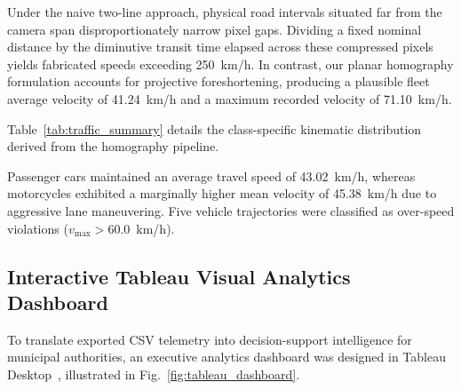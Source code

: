 \documentclass[conference]{IEEEtran}
\begin{document}
Under the naive two-line approach, physical road intervals situated far from the camera span disproportionately narrow pixel gaps. Dividing a fixed nominal distance by the diminutive transit time elapsed across these compressed pixels yields fabricated speeds exceeding 250~km/h. In contrast, our planar homography formulation accounts for projective foreshortening, producing a plausible fleet average velocity of 41.24~km/h and a maximum recorded velocity of 71.10~km/h.

Table~\ref{tab:traffic_summary} details the class-specific kinematic distribution derived from the homography pipeline.

\begin{table}[htbp]
\caption{Class-Wise Vehicle Count and Kinematic Summary}
\label{tab:traffic_summary}
\centering
{}
\end{table}

Passenger cars maintained an average travel speed of 43.02~km/h, whereas motorcycles exhibited a marginally higher mean velocity of 45.38~km/h due to aggressive lane maneuvering. Five vehicle trajectories were classified as over-speed violations ($v_{\text{max}} > 60.0$~km/h).

\subsection{Interactive Tableau Visual Analytics Dashboard}
To translate exported CSV telemetry into decision-support intelligence for municipal authorities, an executive analytics dashboard was designed in Tableau Desktop~\cite{stolte2002polaris}, illustrated in Fig.~\ref{fig:tableau_dashboard}.
\end{document}

